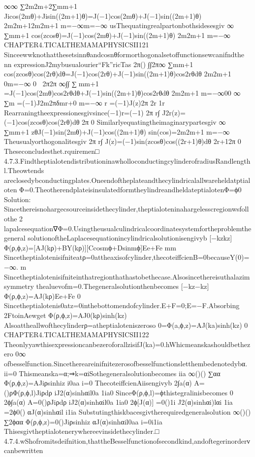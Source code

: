 {{{{{{∞∞
∑2m2m+2∑mm+1
Jicos(2mθ)+Jisin((2m+1)θ)=J(−1)cos(2mθ)+J(−1)sin((2m+1)θ)
2m2m+12m2m+1
m=−∞m=−∞
usThequatingrealpartonbothsidesesgiv
∞
∑mm+1
cos(zcosθ)=J(−1)cos(2mθ)+J(−1)sin((2m+1)θ)
2m2m+1
m=−∞
CHAPTER4.TICALTHEMAMAPHYSICSII121
Sinceewwknothattheset{sinnθ}and{cosnθ}formorthogonalsetoffunctionsewcanifndthe
nn
expressionJ2mybusualourier“Fk”ricTas
2π()
∫∫2π∞
∑mm+1
cos(zcosθ)cos(2rθ)dθ=J(−1)cos(2rθ)+J(−1)sin((2m+1)θ)cos2rθdθ
2m2m+1
0m=−∞
0
2π2π
∞∫∫
∑mm+1
=J(−1)cos(2mθ)cos2rθdθ+J(−1)sin((2m+1)θ)cos2rθdθ
2m2m+1
m=−∞00
∞
∑m
=(−1)J2m2πδmr+0
m=−∞
r
=(−1)J(z)2π
2r
1r
Rearraningtheexpressionesgivsince(−1)r=(−1)
2π
r∫
J2r(z)=(−1)cos(zcosθ)cos(2rθ)dθ
2π
0
Similarlyequatingtheimaginarypartesgiv
∞
∑mm+1
zθJ(−1)sin(2mθ)+J(−1)cos((2m+1)θ)
sin(cos)=2m2m+1
m=−∞
Theusualyorthogonalitesgiv
2π
r∫
J(z)=(−1)sin(zcosθ)cos((2r+1)θ)dθ
2r+12π
0
Theseconcludesthet.rquiremen□
4.7.3.FindtheptialotendistributioninawholloconductingcylinderofradiusRandlengthl.Theowtends
areclosedybconductingplates.Oneendoftheplateandthecylindricalallwareheldatptialoten
Φ=0.TheotherendplateisinsulatedformtheylindreandheldateptialotenΦ=ϕ0
Solution:
Sincethereisnohargecsourceinsidethecylinder,theptialoteninahargelesscregionwsfollothe
2
lapalcesequation∇Φ=0.Usingtheusualculindricalcoordinatesystemfortheproblemthegeneral
solutionoftheLaplacesequationincylindricalsolutionisengivyb
[−kzkz]
Φ(ρ,ϕ,z)=[AJ(kρ)+BY(kρ)][Ccosmϕ+Dsinmϕ]Ee+Fe
mm
Sincetheptialotenisifniteatρ=0attheaxisofcylinder,thecoteiffcienB=0becauseY(0)=−∞.
m
Sincetheptialotenisifniteinthatregionthathastobethecase.Alsosincethereisuthalazimsymmetry
thealuevofm=0.Thegeneralsolutionthenbecomes
[−kz−kz]
Φ(ρ,ϕ,z)=AJ(kρ)Ee+Fe
0
Sincetheptialotenis0atz=0inthebottomendofcylinder.E+F=0;E=−F.Absorbing
2FtoinAewget
Φ(ρ,ϕ,z)=AJ0(kρ)sinh(kz)
Alsoattheallwofthecylinderρ=atheptialoteniszeroso
0=Φ(a,ϕ,z)=AJ(ka)sinh(kz)
0
CHAPTER4.TICALTHEMAMAPHYSICSII122
TheonlyyawthisexpressioncanbezeroforallzisifJ(ka)=0.hWhicmeanskashouldbethezero
0∞
ofbesselfunction.Sincethereareinifnitezerosofbesselfunctionsletthembedenotedyb{α}.
ii=0
Thismeanska=α;⇒k=αiSothegeneralsolutionbecomes
iia
∞()()
∑αα
Φ(ρ,ϕ,z)=AJiρsinhiz
i0aa
i=0
ThecoteiffcienAiisengivyb
2∫a(α)
A=()ρΦ(ρ,ϕ,l)Jiρdρ
iJ2(α)sinhαil0a
1ia0
SinceΦ(ρ,ϕ,l)=ϕthistegralinisbecomes
0
2ϕ∫a(α)
A=0()ρJiρdρ
iJ2(α)sinhαil0a
1ia0
2ϕ[J(α)]
=0()1i
J2(α)sinhαi)lαi
1ia
=2ϕ0()
αJ(α)sinhαil
i1ia
Substutingthiskbacesgivtherequiredgeneralsolution
∞()()
∑2ϕαα
Φ(ρ,ϕ,z)=0()Jiρsinhiz
αJ(α)sinhαil0aa
i=0i1ia
Thisesgivtheptialotenerywhereevinsidethecylinder.□
4.7.4.wShofromitsdeifnition,thattheBesselfunctionofsecondkind,andoftegerinorderνcanbewritten
}}}}}}
